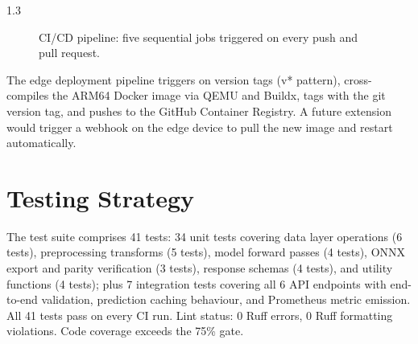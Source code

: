 \begin{spacing}{1.3}
\begin{figure}[H]
\caption{CI/CD pipeline: five sequential jobs triggered on every push and pull request.}
\label{fig:cicd}
\end{figure}

The edge deployment pipeline triggers on version tags (v* pattern), cross-compiles the ARM64 Docker image via QEMU and Buildx, tags with the git version tag, and pushes to the GitHub Container Registry. A future extension would trigger a webhook on the edge device to pull the new image and restart automatically.

\section{Testing Strategy}

The test suite comprises 41 tests: 34 unit tests covering data layer operations (6 tests), preprocessing transforms (5 tests), model forward passes (4 tests), ONNX export and parity verification (3 tests), response schemas (4 tests), and utility functions (4 tests); plus 7 integration tests covering all 6 API endpoints with end-to-end validation, prediction caching behaviour, and Prometheus metric emission. All 41 tests pass on every CI run. Lint status: 0 Ruff errors, 0 Ruff formatting violations. Code coverage exceeds the 75\% gate.

\end{spacing}
